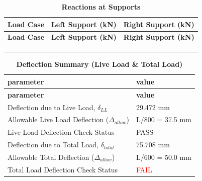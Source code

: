 \documentclass[12pt,a4paper]{report}
\numberwithin{table}{chapter}
\numberwithin{figure}{chapter}
\begin{document}
\endgroup

\vspace{1em}
\begin{longtable}{|>{\centering\arraybackslash}p{5.2cm}|>{\centering\arraybackslash}p{5.2cm}|>{\centering\arraybackslash}p{5.2cm}|}
\caption{\textbf{Reactions at Supports}}
\hline
\rowcolor{tableHead} \textbf{Load Case} & \textbf{Left Support (kN)} & \textbf{Right Support (kN)} \\[6pt]
\hline
\endfirsthead
\hline
\rowcolor{tableHead} \textbf{Load Case} & \textbf{Left Support (kN)} & \textbf{Right Support (kN)} \\[6pt]
\hline
\endhead
 &  &  \\[6pt]
\hline
 &  &  \\[6pt]
\hline
 &  &  \\[6pt]
\hline
\end{longtable}

\vspace{1em}
\begin{longtable}{|L{7cm}|p{8.5cm}|}
\caption{\textbf{Deflection Summary (Live Load \& Total Load)}}
\hline
{} \textbf{parameter} & \textbf{value} \\
\hline
\endfirsthead
\hline
{} \textbf{parameter} & \textbf{value} \\
\hline
\endhead
\textnormal{Deflection due to Live Load, $\delta_{LL}$} & 29.472 mm \\[6pt]
\hline
\textnormal{Allowable Live Load Deflection ($\Delta_{allow}$)} & L/800 = 37.5 mm \\[6pt]
\hline
\textnormal{Live Load Deflection Check Status} & PASS \\[6pt]
\hline
\textnormal{Deflection due to Total Load, $\delta_{total}$} & 75.708 mm \\[6pt]
\hline
\textnormal{Allowable Total Deflection ($\Delta_{allow}$)} & L/600 = 50.0 mm \\[6pt]
\hline
\textnormal{Total Load Deflection Check Status} & \textcolor{red}{FAIL} \\[6pt]
\hline
\end{longtable}

\vspace{1em}
\noindent
\noindent{}
\noindent{}
\noindent{}
\end{document}
